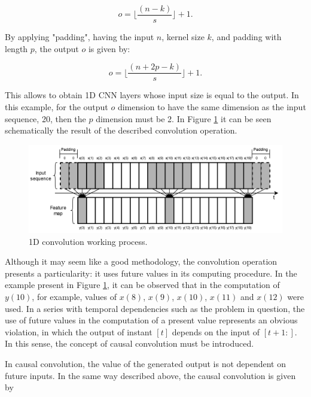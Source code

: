 \begin{equation}
    o = \lfloor \frac{(n-k)}{s} \rfloor + 1 .
\end{equation}

By applying "padding", having the input $n$, kernel size $k$, and padding with length $p$, the output $o$ is given by:

\begin{equation}
    o = \lfloor \frac{(n+2p-k)}{s} \rfloor + 1 .
\end{equation}

This allows to obtain \ac{1D CNN} layers whose input size is equal to the output. In this example, for the output $o$ dimension to have the same dimension as the input sequence, 20, then the $p$ dimension must be 2. In Figure \ref{conv1} it can be seen schematically the result of the described convolution operation.

\begin{figure}[h!]
    \centering
    \begin{center}
    \includegraphics[width=1\textwidth]{Images/conv1.png}
    \caption{1D convolution working process.}
    \label{conv1}
    \end{center}
\end{figure}

Although it may seem like a good methodology, the convolution operation presents a particularity: it uses future values in its computing procedure. In the example present in Figure \ref{conv1}, it can be observed that in the computation of $y(10)$, for example, values of $x(8)$, $x(9)$, $x(10)$, $x(11)$ and $x(12)$ were used. In a series with temporal dependencies such as the problem in question, the use of future values in the computation of a present value represents an obvious violation, in which the output of instant $[t]$ depends on the input of $[t+1:]$. In this sense, the concept of causal convolution must be introduced. 

In causal convolution, the value of the generated output is not dependent on future inputs. In the same way described above, the causal convolution is given by 

